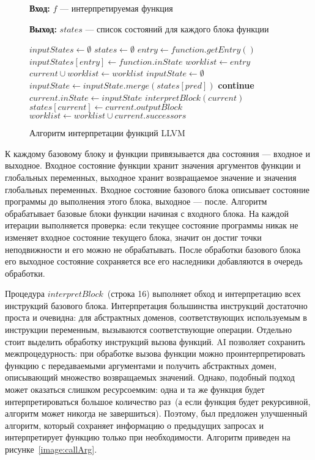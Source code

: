 \begin{figure}[h!]
\textbf{Вход:} $f$ --- интерпретируемая функция

\textbf{Выход:} $states$ --- список состояний для каждого блока функции

\begin{algorithmic}[1]
\State $inputStates \gets \emptyset$
\State $states \gets \emptyset$
\State $entry \gets function.getEntry()$
\State $inputStates[entry] \gets function.inState$
\State $worklist \gets entry$
    \State $current \cup worklist \gets worklist$
    \State $inputState \gets \emptyset$
        \State $inputState \gets inputState.merge(states[pred])$
    \EndFor
        \State \textbf{continue}
    \EndIf
    \State $current.inState \gets inputState$
    \State $interpretBlock(current)$
    \State $states[current] \gets current.outputBlock$
    \State $worklist \gets worklist \cup current.successors$
\EndWhile
\end{algorithmic}
\caption{Алгоритм интерпретации функций LLVM}
\label{image:functionInterpretation}
\end{figure}

К каждому базовому блоку и функции привязывается два состояния --- входное и 
выходное. Входное состояние функции хранит значения аргументов функции и 
глобальных переменных, выходное хранит возвращаемое значение и значения 
глобальных переменных. Входное состояние базового блока описывает состояние 
программы до выполнения этого блока, выходное --- после. Алгоритм обрабатывает 
базовые блоки функции начиная с входного блока. На каждой итерации выполняется
проверка: если текущее состояние программы никак не изменяет входное состояние
текущего блока, значит он достиг точки неподвижности и его можно не 
обрабатывать. После обработки базового блока его выходное состояние 
сохраняется все его наследники добавляются в очередь обработки.

Процедура $interpretBlock$~(строка 16) выполняет обход и 
интерпретацию всех инструкций базового блока. Интерпретация большинства 
инструкций достаточно проста и очевидна: для абстрактных доменов, 
соответствующих используемым в инструкции переменным, вызываются 
соответствующие операции. Отдельно стоит выделить обработку инструкций вызова 
функций. AI позволяет сохранить межпроцедурность: при обработке вызова функции
можно проинтерпретировать функцию с передаваемыми аргументами и получить 
абстрактных домен, описывающий множество возвращаемых значений. Однако, 
подобный подход может оказаться слишком ресурсоемким: одна и та же функция 
будет интерпретироваться большое количество раз~(а если функция будет
рекурсивной, алгоритм может никогда не завершиться). Поэтому, был предложен 
улучшенный алгоритм, который сохраняет информацию о предыдущих запросах и 
интерпретирует функцию только при необходимости. Алгоритм приведен на 
рисунке~\ref{image:callArg}.

